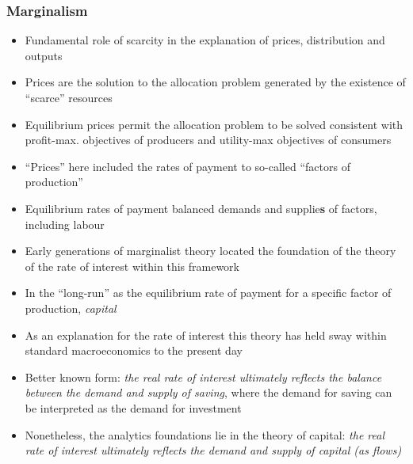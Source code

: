 \documentclass[a4paper,twoside]{article}
\numberwithin{equation}{section}
\numberwithin{figure}{section}
\begin{document}
	\subsubsection{Marginalism}
	\begin{itemize}
		\item Fundamental role of scarcity in the explanation of prices, distribution and outputs 
		\item Prices are the solution to the allocation problem generated by the existence of ``scarce'' resources
		\item Equilibrium prices permit the allocation problem to be solved consistent with profit-max. objectives of producers and utility-max objectives of consumers
		\item ``Prices'' here included the rates of payment to so-called ``factors of production''
		\item Equilibrium rates of payment balanced demands and supplie\textbf{s} of factors, including labour
		\item Early generations of marginalist theory located the foundation of the theory of the rate of interest within this framework
		\item In the ``long-run'' as the equilibrium rate of payment for a specific factor of production, \textit{capital}
		\item As an explanation for the rate of interest this theory has held sway within standard macroeconomics to the present day
		\item Better known form: \textit{the real rate of interest ultimately reflects the balance between the demand and supply of saving}, where the demand for saving can be interpreted as the demand for investment
		\item Nonetheless, the analytics foundations lie in the theory of capital: \textit{the real rate of interest ultimately reflects the demand and supply of capital (as flows)}
	\end{itemize}
\end{document}
